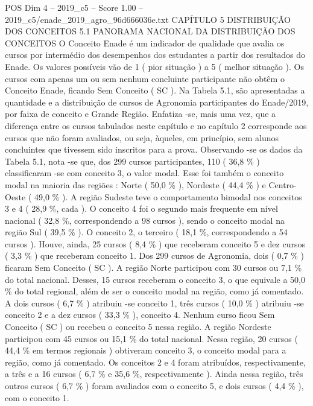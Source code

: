 \begin{textsample}{POS Dim 4 – 2019\_c5 – Score 1.00 – 2019\_c5/enade\_2019\_agro\_96d666036e.txt}  \label{ex:f4_pos_200}
CAPÍTULO 5 DISTRIBUIÇÃO DOS CONCEITOS 5.1 PANORAMA NACIONAL DA DISTRIBUIÇÃO DOS CONCEITOS O Conceito Enade é um indicador de qualidade que avalia os cursos por intermédio dos desempenhos dos estudantes a partir dos resultados do Enade.
Os valores possíveis vão de 1 ( pior situação ) a 5 ( melhor situação ).
Os cursos com apenas um ou sem nenhum concluinte participante não obtêm o Conceito Enade, ficando Sem Conceito ( SC ).
Na Tabela 5.1, são apresentadas a quantidade e a distribuição de cursos de Agronomia participantes do Enade/2019, por faixa de conceito e Grande Região.
Enfatiza -se, mais uma vez, que a diferença entre os cursos tabulados neste capítulo e no capítulo 2 corresponde aos cursos que não foram avaliados, ou seja, àqueles, em princípio, sem alunos concluintes que tivessem sido inscritos para a prova.
Observando -se os dados da Tabela 5.1, nota -se que, dos 299 cursos participantes, 110 ( 36,8 \% ) classificaram -se com conceito 3, o valor modal.
Esse foi também o conceito modal na maioria das regiões : Norte ( 50,0 \% ), Nordeste ( 44,4 \% ) e Centro-Oeste ( 49,0 \% ).
A região Sudeste teve o comportamento bimodal nos conceitos 3 e 4 ( 28,9 \%, cada ).
O conceito 4 foi o segundo mais frequente em nível nacional ( 32,8 \%, correspondendo a 98 cursos ), sendo o conceito modal na região Sul ( 39,5 \% ).
O conceito 2, o terceiro ( 18,1 \%, correspondendo a 54 cursos ).
Houve, ainda, 25 cursos ( 8,4 \% ) que receberam conceito 5 e dez cursos ( 3,3 \% ) que receberam conceito 1.
Dos 299 cursos de Agronomia, dois ( 0,7 \% ) ficaram Sem Conceito ( SC ).
A região Norte participou com 30 cursos ou 7,1 \% do total nacional.
Desses, 15 cursos receberam o conceito 3, o que equivale a 50,0 \% do total regional, além de ser o conceito modal na região, como já comentado.
A dois cursos ( 6,7 \% ) atribuiu -se conceito 1, três cursos ( 10,0 \% ) atribuiu -se conceito 2 e a dez cursos ( 33,3 \% ), conceito 4.
Nenhum curso ficou Sem Conceito ( SC ) ou recebeu o conceito 5 nessa região.
A região Nordeste participou com 45 cursos ou 15,1 \% do total nacional.
Nessa região, 20 cursos ( 44,4 \% em termos regionais ) obtiveram conceito 3, o conceito modal para a região, como já comentado.
Os conceitos 2 e 4 foram atribuídos, respectivamente, a três e a 16 cursos ( 6,7 \% e 35,6 \%, respectivamente ).
Ainda nessa região, três outros cursos ( 6,7 \% ) foram avaliados com o conceito 5, e dois cursos ( 4,4 \% ), com o conceito 1.

\end{textsample}
